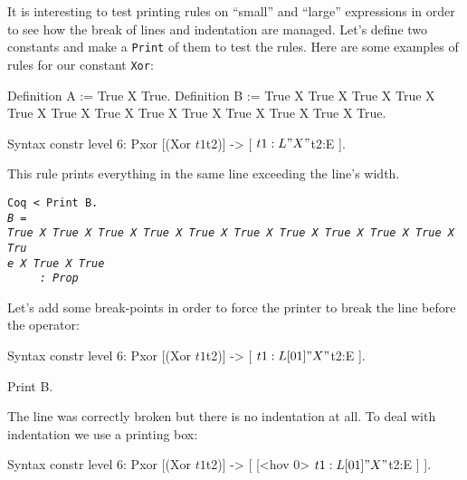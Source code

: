 \begin{enumerate}
It is interesting to test printing rules on ``small'' and ``large''
expressions in order to see how the break of lines and indentation are
managed. Let's define two constants and make a \verb+Print+ of them to
test the rules.  Here are some examples of rules for our constant
\verb+Xor+:

\begin{coq_example*} 
Definition A := True X True.
Definition B := True X True X True X True X True X True X True 
                 X True X True X True X True X True X True.
\end{coq_example*}
\begin{coq_example*}
Syntax constr level 6:
  Pxor [(Xor $t1 $t2)] -> [ $t1:L " X " $t2:E ].
\end{coq_example*}


This rule prints everything in the same line exceeding the line's
width.


\begin{small}
\begin{flushleft}
\verb!Coq < Print B.!\\
\texttt{\textit{B~=~}}\\
\texttt{\textit{True~X~True~X~True~X~True~X~True~X~True~X~True~X~True~X~True~X~True~X~Tru}}\\
\texttt{\textit{e~X~True~X~True}}\\
\texttt{\textit{~~~~~:~Prop}}\\
\end{flushleft}
\end{small}

Let's add some break-points in order to force the printer to break the
line before the operator:

\begin{coq_example*}
Syntax constr level 6:
  Pxor [(Xor $t1 $t2)] -> [ $t1:L [0 1] " X " $t2:E ].
\end{coq_example*}

\begin{coq_example}
Print B.
\end{coq_example}

The line was correctly broken but there is no indentation at all. To
deal with indentation we use a printing box:

\begin{coq_example*}
Syntax constr level 6:
  Pxor [(Xor $t1 $t2)] ->
   [ [<hov 0> $t1:L [0 1] " X " $t2:E ] ].
\end{coq_example*}


\end{enumerate}
